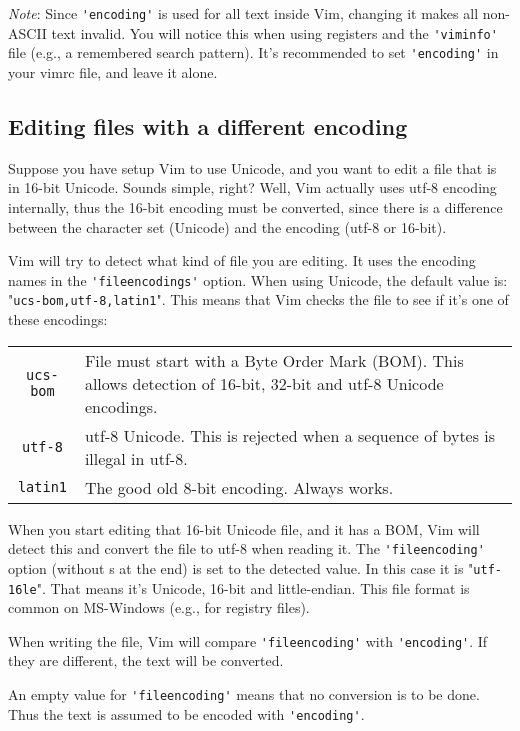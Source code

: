 \emph{Note}:
Since \verb!'encoding'! is used for all text inside Vim, changing it makes all non-ASCII text invalid.
You will notice this when using registers and the \verb!'viminfo'! file (e.g., a remembered search pattern).
It's recommended to set \verb!'encoding'! in your vimrc file, and leave it alone.
\subsection{Editing files with a different encoding}
Suppose you have setup Vim to use Unicode, and you want to edit a file that is in 16-bit Unicode.
Sounds simple, right?  Well, Vim actually uses utf-8 encoding internally, thus the 16-bit encoding must be converted, since there is a difference between the character set (Unicode) and the encoding (utf-8 or 16-bit).

Vim will try to detect what kind of file you are editing.
It uses the encoding names in the \verb!'fileencodings'! option.
When using Unicode, the default value is: "\verb!ucs-bom,utf-8,latin1!".
This means that Vim checks the file to see if it's one of these encodings:

\begin{center} \begin{tabularx}{\textwidth}{c X}
				\texttt{ucs-bom} & File must start with a Byte Order Mark (BOM).  This allows detection of 16-bit, 32-bit and utf-8 Unicode encodings. \\
				\texttt{utf-8} & utf-8 Unicode.  This is rejected when a sequence of bytes is illegal in utf-8. \\
				\texttt{latin1} & The good old 8-bit encoding.  Always works. \\
\end{tabularx} \end{center}
When you start editing that 16-bit Unicode file, and it has a BOM, Vim will detect this and convert the file to utf-8 when reading it.
The \verb!'fileencoding'! option (without s at the end) is set to the detected value.
In this case it is "\verb!utf-16le!".
That means it's Unicode, 16-bit and little-endian.
This file format is common on MS-Windows (e.g., for registry files).

When writing the file, Vim will compare \verb!'fileencoding'! with \verb!'encoding'!.
If they are different, the text will be converted.

An empty value for \verb!'fileencoding'! means that no conversion is to be done.
Thus the text is assumed to be encoded with \verb!'encoding'!.

